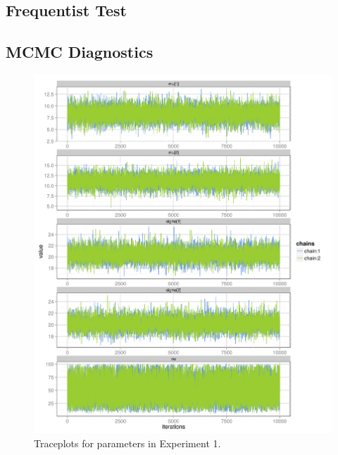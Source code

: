 

\clearpage

\subsection{Frequentist Test}





\clearpage

\subsection{MCMC Diagnostics}

\begin{figure}[ht!]
  \centering
  \includegraphics{../figures/main/trace_1.png}
  \caption{Traceplots for parameters in Experiment 1.}
  \label{fig:trace_1}
\end{figure}

